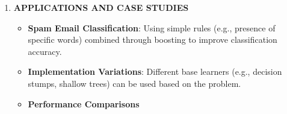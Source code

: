 \documentclass[
  12pt,
]{report}
\providecommand{\tightlist}{%
  \setlength{\itemsep}{0pt}\setlength{\parskip}{0pt}}
\begin{document}
\begin{enumerate}
\begin{itemize}
\begin{enumerate}
      \begin{itemize}
      \tightlist
      \item
        Train weak learner \(h_t\) with distribution \(D_t\).
      \item
        Compute error \(\epsilon_t = P_{x \sim D_t}[h_t(x) \neq y]\).
      \item
        Compute \(\alpha_t = \frac{1}{2} \ln\left(\frac{1-\epsilon_t}{\epsilon_t}\right)\).
      \item
        Update \(D_{t+1}(i) = \frac{D_t(i) \cdot e^{-\alpha_t \cdot y_i \cdot h_t(x_i)}}{Z_t}\), where \(Z_t\) is a normalization factor.
      \end{itemize}
    \item
      Output final hypothesis \(H(x) = \text{sign}\left(\sum_{t=1}^T \alpha_t h_t(x)\right)\).
    \end{enumerate}
  \item
    \textbf{Complexity Analysis}

    \begin{itemize}
    \tightlist
    \item
      Training Time: Depends linearly on the number of iterations \(T\) and the complexity of the weak learner.
    \item
      Space Complexity: Linear with respect to the number of examples and the number of weak learners.
    \end{itemize}
  \item
    \textbf{Convergence Properties}

    \begin{itemize}
    \tightlist
    \item
      Converges to a low training error rate.
    \item
      Theoretical guarantees under certain conditions.
    \end{itemize}
  \end{itemize}
\item
  \textbf{APPLICATIONS AND CASE STUDIES}

  \begin{itemize}
  \item
    \textbf{Spam Email Classification}: Using simple rules (e.g., presence of specific words) combined through boosting to improve classification accuracy.
  \item
    \textbf{Implementation Variations}: Different base learners (e.g., decision stumps, shallow trees) can be used based on the problem.
  \item
    \textbf{Performance Comparisons}


\end{itemize}
\end{enumerate}
\end{document}
